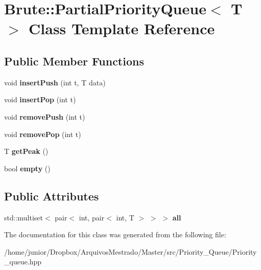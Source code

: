 \hypertarget{classBrute_1_1PartialPriorityQueue}{}\section{Brute\+:\+:Partial\+Priority\+Queue$<$ T $>$ Class Template Reference}
\label{classBrute_1_1PartialPriorityQueue}
\subsection*{Public Member Functions}
\begin{DoxyCompactItemize}
\item 
\mbox{\label{classBrute_1_1PartialPriorityQueue_a67fca61de9266a9df9a59d327e2743d5}} 
void {\bfseries insert\+Push} (int t, T data)
\item 
\mbox{\label{classBrute_1_1PartialPriorityQueue_a2fc548b76d208334f3e237afb6b2eb93}} 
void {\bfseries insert\+Pop} (int t)
\item 
\mbox{\label{classBrute_1_1PartialPriorityQueue_aca1b2c7c9adb51f1d0518ca0e2c79905}} 
void {\bfseries remove\+Push} (int t)
\item 
\mbox{\label{classBrute_1_1PartialPriorityQueue_a74a0cac80a46b861a3869473c9b9def8}} 
void {\bfseries remove\+Pop} (int t)
\item 
\mbox{\label{classBrute_1_1PartialPriorityQueue_ad1ca11a46c031d68cf3cd61e820c0036}} 
T {\bfseries get\+Peak} ()
\item 
\mbox{\label{classBrute_1_1PartialPriorityQueue_acc88fe46c9844d428e8708ca6e4ce1b9}} 
bool {\bfseries empty} ()
\end{DoxyCompactItemize}
\subsection*{Public Attributes}
\begin{DoxyCompactItemize}
\item 
\mbox{\label{classBrute_1_1PartialPriorityQueue_a88b04ce13bdbc7e71dd36dbd889b2c04}} 
std\+::multiset$<$ pair$<$ int, pair$<$ int, T $>$ $>$ $>$ {\bfseries all}
\end{DoxyCompactItemize}


The documentation for this class was generated from the following file\+:\begin{DoxyCompactItemize}
\item 
/home/junior/\+Dropbox/\+Arquivos\+Mestrado/\+Master/src/\+Priority\+\_\+\+Queue/Priority\+\_\+queue.\+hpp\end{DoxyCompactItemize}
